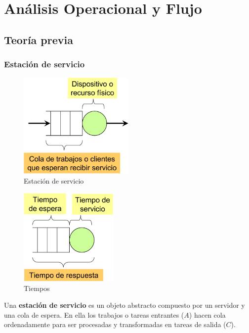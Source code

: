 \chapter{Análisis Operacional y Flujo}
\noindent
\section{Teoría previa}
\subsection{Estación de servicio}
\begin{multicols}{2}
\begin{figure}[H]
    \centering
    \includegraphics[width=0.5\textwidth]{Images/Estacion_ser.png}
    \caption{Estación de servicio}
\end{figure}
\begin{figure}[H]
    \centering
    \includegraphics[width=0.43\textwidth]{Images/tiempos_est.png}
    \caption{Tiempos}
\end{figure}
\end{multicols}
Una \textbf{estación de servicio} es un objeto abstracto compuesto por un servidor y una cola de espera. En ella los trabajos o tareas entrantes ($A$) hacen cola ordenadamente para ser procesadas y transformadas en tareas de salida ($C$).\\

